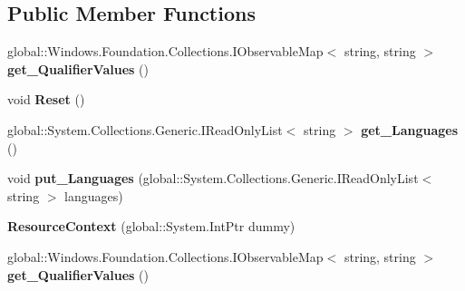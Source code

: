 \subsection*{Public Member Functions}
\begin{DoxyCompactItemize}
\item 
\mbox{\label{class_windows_1_1_application_model_1_1_resources_1_1_core_1_1_resource_context_ac228527597261c45581d0c380d6339bd}} 
global\+::\+Windows.\+Foundation.\+Collections.\+I\+Observable\+Map$<$ string, string $>$ {\bfseries get\+\_\+\+Qualifier\+Values} ()
\item 
\mbox{\label{class_windows_1_1_application_model_1_1_resources_1_1_core_1_1_resource_context_a8d2f7782f2b1b6983c33b2297f40b075}} 
void {\bfseries Reset} ()
\item 
\mbox{\label{class_windows_1_1_application_model_1_1_resources_1_1_core_1_1_resource_context_a56ecf1f243ff7d36fb0a7621f3016c07}} 
global\+::\+System.\+Collections.\+Generic.\+I\+Read\+Only\+List$<$ string $>$ {\bfseries get\+\_\+\+Languages} ()
\item 
\mbox{\label{class_windows_1_1_application_model_1_1_resources_1_1_core_1_1_resource_context_aeb5ce93158d04ebbec8c22b384409285}} 
void {\bfseries put\+\_\+\+Languages} (global\+::\+System.\+Collections.\+Generic.\+I\+Read\+Only\+List$<$ string $>$ languages)
\item 
\mbox{\label{class_windows_1_1_application_model_1_1_resources_1_1_core_1_1_resource_context_a718c064119f7ea5fd82856c6423dad71}} 
{\bfseries Resource\+Context} (global\+::\+System.\+Int\+Ptr dummy)
\item 
\mbox{\label{class_windows_1_1_application_model_1_1_resources_1_1_core_1_1_resource_context_ac228527597261c45581d0c380d6339bd}} 
global\+::\+Windows.\+Foundation.\+Collections.\+I\+Observable\+Map$<$ string, string $>$ {\bfseries get\+\_\+\+Qualifier\+Values} ()

\end{DoxyCompactItemize}
